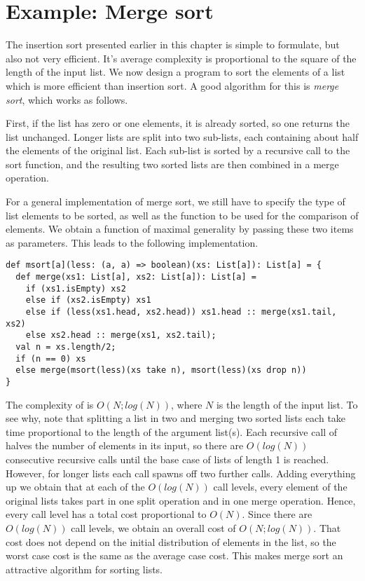 \documentclass[a4paper,12pt,twoside,titlepage]{book}
\begin{document}
\section{Example: Merge sort}

The insertion sort presented earlier in this chapter is simple to
formulate, but also not very efficient. It's average complexity is
proportional to the square of the length of the input list. We now
design a program to sort the elements of a list which is more
efficient than insertion sort. A good algorithm for this is {\em merge
sort}, which works as follows.

First, if the list has zero or one elements, it is already sorted, so
one returns the list unchanged. Longer lists are split into two
sub-lists, each containing about half the elements of the original
list. Each sub-list is sorted by a recursive call to the sort
function, and the resulting two sorted lists are then combined in a
merge operation.

For a general implementation of merge sort, we still have to specify
the type of list elements to be sorted, as well as the function to be
used for the comparison of elements. We obtain a function of maximal
generality by passing these two items as parameters. This leads to the
following implementation.
\begin{lstlisting}
def msort[a](less: (a, a) => boolean)(xs: List[a]): List[a] = {
  def merge(xs1: List[a], xs2: List[a]): List[a] = 
    if (xs1.isEmpty) xs2
    else if (xs2.isEmpty) xs1
    else if (less(xs1.head, xs2.head)) xs1.head :: merge(xs1.tail, xs2)
    else xs2.head :: merge(xs1, xs2.tail);
  val n = xs.length/2;
  if (n == 0) xs
  else merge(msort(less)(xs take n), msort(less)(xs drop n))
}
\end{lstlisting}
The complexity of  is $O(N;log(N))$, where $N$ is the
length of the input list. To see why, note that splitting a list in
two and merging two sorted lists each take time proportional to the
length of the argument list(s). Each recursive call of 
halves the number of elements in its input, so there are $O(log(N))$
consecutive recursive calls until the base case of lists of length 1
is reached.  However, for longer lists each call spawns off two
further calls. Adding everything up we obtain that at each of the
$O(log(N))$ call levels, every element of the original lists takes
part in one split operation and in one merge operation. Hence, every
call level has a total cost proportional to $O(N)$. Since there are
$O(log(N))$ call levels, we obtain an overall cost of
$O(N;log(N))$. That cost does not depend on the initial distribution
of elements in the list, so the worst case cost is the same as the
average case cost. This makes merge sort an attractive algorithm for
sorting lists.
\end{document}
